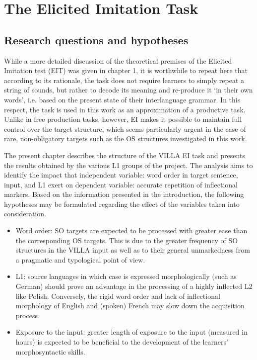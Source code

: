 \chapter{The Elicited Imitation Task}

\section{Research questions and hypotheses}\label{sec:04:1}

While a more detailed discussion of the theoretical premises of the Elicited Imitation test (EIT) was given in chapter 1, it is worthwhile to repeat here that according to its rationale, the task does not require learners to simply repeat a string of sounds, but rather to decode its meaning and re-produce it ‘in their own words’, i.e. based on the present state of their interlanguage grammar. In this respect, the task is used in this work as an approximation of a productive task. Unlike in free production tasks, however, EI makes it possible to maintain full control over the target structure, which seems particularly urgent in the case of rare, non-obligatory targets such as the OS structures investigated in this work.

The present chapter describes the structure of the VILLA EI task and presents the results obtained by the various L1 groups of the project. The analysis aims to identify the impact that independent variable: word order in target sentence, input, and L1 exert on dependent variable: accurate repetition of inflectional markers. Based on the information presented in the introduction, the following hypotheses may be formulated regarding the effect of the variables taken into consideration.

\begin{itemize}
    \item Word order: SO targets are expected to be processed with greater ease than the corresponding OS targets. This is due to the greater frequency of SO structures in the VILLA input as well as to their general unmarkedness from a pragmatic and typological point of view.
    \item L1: source languages in which case is expressed morphologically (such as German) should prove an advantage in the processing of a highly inflected L2 like Polish. Conversely, the rigid word order and lack of inflectional morphology of English and (spoken) French may slow down the acquisition process.
    \item Exposure to the input: greater length of exposure to the input (measured in hours) is expected to be beneficial to the development of the learners’ morphosyntactic skills.
\end{itemize}

